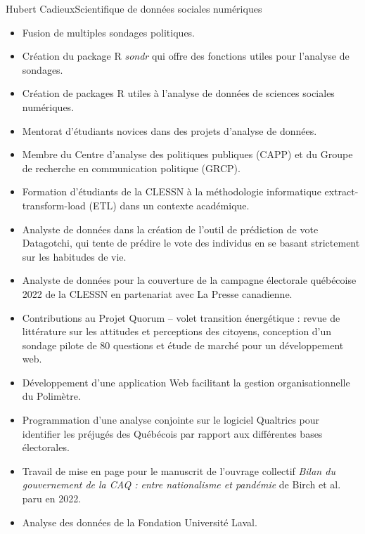\documentclass{article}
\begin{document}
\begin{cv}[avatar]{Hubert Cadieux}{Scientifique de données sociales numériques}
\begin{itemize}
    \item Fusion de multiples sondages politiques.
    \item Création du package R \textit{sondr} qui offre des fonctions utiles pour l'analyse de sondages.
    \item Création de packages R utiles à l'analyse de données de sciences sociales numériques.
    \item Mentorat d'étudiants novices dans des projets d'analyse de données.
    \item Membre du Centre d'analyse des politiques publiques (CAPP) et du Groupe de recherche en communication politique (GRCP).
    \item Formation d'étudiants de la CLESSN à la méthodologie informatique extract-transform-load (ETL) dans un contexte académique.
    \item Analyste de données dans la création de l'outil de prédiction de vote Datagotchi, qui tente de prédire le vote des individus en se basant strictement sur les habitudes de vie.
    \item Analyste de données pour la couverture de la campagne électorale québécoise 2022 de la CLESSN en partenariat avec La Presse canadienne.
    \item Contributions au Projet Quorum – volet transition énergétique : revue de littérature sur les attitudes et perceptions des citoyens, conception d'un sondage pilote de 80 questions et étude de marché pour un développement web.
    \item Développement d'une application Web facilitant la gestion organisationnelle du Polimètre.
    \item Programmation d'une analyse conjointe sur le logiciel Qualtrics pour identifier les préjugés des Québécois par rapport aux différentes bases électorales.
    \item Travail de mise en page pour le manuscrit de l'ouvrage collectif \textit{Bilan du gouvernement de la CAQ : entre nationalisme et pandémie} de Birch et al. paru en 2022.
    \item Analyse des données de la Fondation Université Laval.
\end{itemize}


\cvsidebar %




\end{cv}
\end{document}
